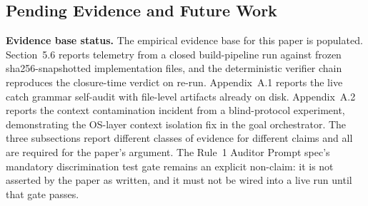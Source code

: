 \documentclass[11pt]{article}
\begin{document}
\subsection{Pending Evidence and Future Work}

\textbf{Evidence base status.} The empirical evidence base for this paper is populated. Section~5.6 reports telemetry from a closed build-pipeline run against frozen sha256-snapshotted implementation files, and the deterministic verifier chain reproduces the closure-time verdict on re-run. Appendix~A.1 reports the live catch grammar self-audit with file-level artifacts already on disk. Appendix~A.2 reports the context contamination incident from a blind-protocol experiment, demonstrating the OS-layer context isolation fix in the goal orchestrator. The three subsections report different classes of evidence for different claims and all are required for the paper's argument. The Rule~1 Auditor Prompt spec's mandatory discrimination test gate remains an explicit non-claim: it is not asserted by the paper as written, and it must not be wired into a live run until that gate passes.
\end{document}
